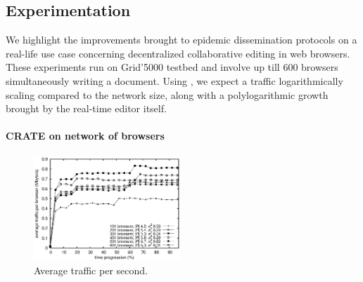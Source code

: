 
\subsection{Experimentation}
\label{subsec:experiments2}

We highlight the improvements brought to epidemic dissemination protocols on a
real-life use case concerning decentralized collaborative editing in web
browsers.  These experiments run on Grid'5000 testbed and involve up till 600
browsers simultaneously writing a document. Using \SPRAY, we expect a traffic
logarithmically scaling compared to the network size, along with a
polylogarithmic growth brought by the real-time editor itself. 

\vspace{-7pt}
\paragraph{CRATE on network of browsers}

\begin{figure}
  \centering
  \includegraphics[width=0.49\textwidth]{img/traffic.eps}
  \caption{\label{fig:traffic}Average traffic per second.}
\end{figure}

